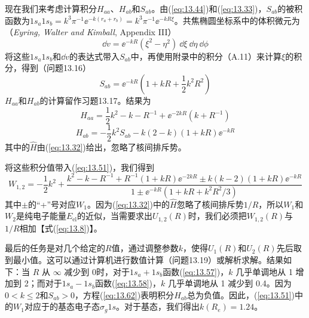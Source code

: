     现在我们来考虑计算积分$H_{aa}$、$H_{ab}$和$S_{ab}$。由(\ref{eq:13.44})和(\ref{eq:13.33})，$S_{ab}$的被积函数为$1s_a1s_b = k^3\pi^{-1} \ee ^{-k\left(r_a + r_b\right)} = k^3\pi^{-1} \ee ^{-kR\xi}$。共焦椭圆坐标系中的体积微元为（\textit{Eyring, Walter and Kimball}, Appendix III）
    \begin{equation}
        \dd v = \ee ^{-kR}\left(\xi^2 - \eta^2\right)\:\dd \xi\:\dd \eta\:\dd \phi
        \label{eq:13.59}
    \end{equation}
    将这些$1s_a1s_b$和$\dd v$的表达式带入$S_{ab}$中，再使用附录中的积分（A.11）来计算$\xi$的积分，得到（问题13.16）
    \begin{equation}
        S_{ab} = \ee ^{-kR}\left(1 + kR + \frac{1}{2}k^2R^2\right)
        \label{eq:13.60}
    \end{equation}
    $H_{aa}$和$H_{ab}$的计算留作习题13.17。结果为
    \begin{equation}
        H_{aa} = \frac{1}{2}k^2 - k - R^{-1} + \ee ^{-2kR}\left(k + R^{-1}\right)
        \label{eq:13.61}
    \end{equation}
    \begin{equation}
        H_{ab} = -\frac{1}{2}k^2S_{ab} - k\left(2 - k\right)\left(1 + kR\right)\ee ^{-kR}
        \label{eq:13.62}
    \end{equation}
    其中的$\hat{H}$由(\ref{eq:13.32})给出，忽略了核间排斥势。

    将这些积分值带入(\ref{eq:13.51})，我们得到
    \begin{equation}
        W_{1,2} = -\frac{1}{2}k^2 + \frac{
            k^2 - k - R^{-1} +R^{-1}\left(1 + kR\right)\ee ^{-2kR} \pm k\left(k - 2\right)\left(1 + kR\right)\ee ^{-kR}
        }{
            1 \pm \ee ^{-kR}\left(1 + kR + k^2R^2/3\right)
        }
        \label{eq:13.63}
    \end{equation}
    其中$\pm$的“+”号对应$W_1$。因为(\ref{eq:13.32})中的$\hat{H}$忽略了核间排斥势$1/R$，所以$W_1$和$W_2$是纯电子能量$E_{\text{el}}$的近似，当需要求出$U_{1,2}\left(R\right)$时，我们必须把$W_{1,2}\left(R\right)$与$1/R$相加【式(\ref{eq:13.8})】。

    最后的任务是对几个给定的$R$值，通过调整参数$k$，使得$U_1\left(R\right)$和$U_2\left(R\right)$先后取到最小值。这可以通过计算机进行数值计算（问题13.19）或解析求解。结果如下：当 $R$ 从 $\infty$ 减少到 0时，对于$1s_a + 1s_b$函数(\ref{eq:13.57})，$k$ 几乎单调地从 1 增加到 2；而对于$1s_a - 1s_b$函数(\ref{eq:13.58})，$k$ 几乎单调地从 1 减少到 0.4。因为$0 < k \leq 2$和$S_{ab} >0$，方程(\ref{eq:13.62})表明积分$H_{ab}$总为负值。因此，(\ref{eq:13.51})中的$W_1$对应于的基态电子态$\sigma_g1s$。对于基态，我们得出$k\left(R_e\right) = 1.24$。

